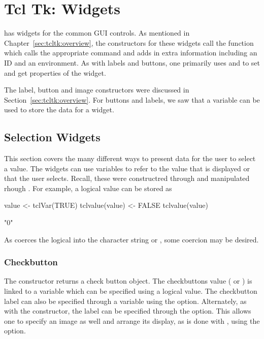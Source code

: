 \chapter{Tcl Tk: Widgets}
\label{sec:tcltk:widgets}

\Tk\/ has widgets for the common GUI controls. As mentioned in
Chapter~\ref{sec:tcltk:overview}, the constructors for these widgets
call the function  which calls the appropriate
\TK\/ command and adds in extra information including an ID and an
environment. As with labels and buttons, one primarily uses
 and  to set and get properties
of the widget.

The label, button and image constructors were discussed in
Section~\ref{sec:tcltk:overview}. For buttons and labels, we saw that
a \TCL\/ variable can be used to store the data for a widget.


\section{Selection Widgets}
\label{sec:tcltk:selection-widgets}

This section covers the many different ways to present data for the
user to select a value. The widgets can use \TCL\/ variables to refer to the value that is displayed or that the user selects. 
Recall, these were constructred through  and manipulated rhough .
For example, a logical value can be stored as
\begin{Schunk}
\begin{Sinput}
 value <- tclVar(TRUE)
 tclvalue(value) <- FALSE
 tclvalue(value)
\end{Sinput}
\begin{Soutput}
[1] "0"
\end{Soutput}
\end{Schunk}
As  coerces the logical into the  character string   or , some coercion may be desired.

\subsection{Checkbutton}
\label{sec:tcltk:checkboxes}

The  constructor returns a check button
object. The checkbuttons value ( or ) is linked
to a \TCL\/ variable which can be specified using a logical value.
The checkbutton label can also be specified through a \TCL\/ variable
using the  option.  Alternately,
as with the  constructor, the label can be specified
through the  option. This allows one to
specify an image as well and arrange its display, as is done with
, using the 
option.

